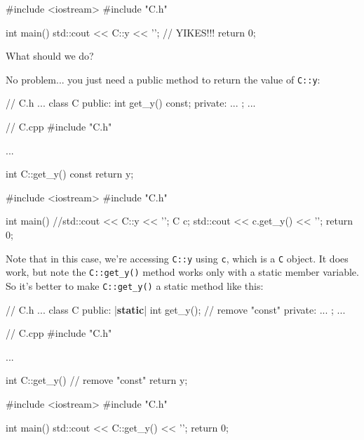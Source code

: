 \begin{consolethree}[escapeinside=||]
#include <iostream>
#include "C.h"

int main()
{
    std::cout << C::y << '\n'; // YIKES!!!
    return 0;
}
\end{consolethree}

What should we do?

No problem... you just need a public method to return the value of
\texttt{C::y}:

\begin{consolethree}[escapeinside=||]
// C.h
...
class C
{
public:
    int get_y() const;
private:
    ...
};
...
\end{consolethree}

\begin{consolethree}[escapeinside=||]
// C.cpp
#include "C.h"

...

int C::get_y() const
{
    return y;
}
\end{consolethree}

\begin{consolethree}[escapeinside=||]
#include <iostream>
#include "C.h"

int main()
{
    //std::cout << C::y << '\n';
    C c;
    std::cout << c.get_y() << '\n';
    return 0;
}
\end{consolethree}

Note that in this case, we're accessing \texttt{C::y}
using \texttt{c}, which is a \texttt{C} object. It does work, but note the
\texttt{C::get\_y()} method works only with a static member variable. So
it's better to make \texttt{C::get\_y()} a static method
like this:

\begin{consolethree}[escapeinside=||]
// C.h
...
class C
{
public:
    |{\bf static}| int get_y(); // remove "const"
private:
    ...
};
...
\end{consolethree}

\begin{consolethree}[escapeinside=||]
// C.cpp
#include "C.h"

...

int C::get_y() // remove "const"
{
    return y;
}
\end{consolethree}

\begin{consolethree}[escapeinside=||]
#include <iostream>
#include "C.h"

int main()
{
    std::cout << C::get_y() << '\n';
    return 0;
}
\end{consolethree}

